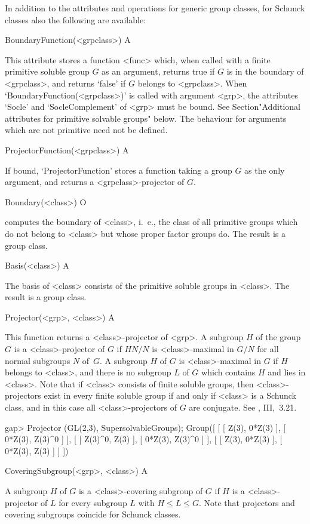 In addition to the attributes and operations for generic group classes,
for Schunck classes also the following are available:

\>BoundaryFunction(<grpclass>) A

This attribute stores a function <func> which, when called with a finite primitive
soluble group $G$ as an argument, returns true if $G$ is in the boundary of <grpclass>,
and returns `false' if $G$ belongs to <grpclass>. When `BoundaryFunction(<grpclass>)'
is called with argument <grp>, the attributes `Socle' and `SocleComplement' of 
<grp> must be bound. See Section"Additional attributes for primitive solvable
groups" below. The behaviour for arguments which are not primitive need not
be defined. 

\>ProjectorFunction(<grpclass>) A

If bound, `ProjectorFunction' stores a function taking a group $G$ as the
only argument, and returns a <grpclass>-projector of $G$. 

\>Boundary(<class>) O

computes the boundary of <class>, i.~e., the class of all
primitive groups which do not belong to <class> but whose proper
factor groups do. The result is a group class. 

\>Basis(<class>) A

The basis of <class> consists of the primitive soluble 
groups in <class>. The result is a group class. 

\>Projector(<grp>, <class>) A

This function returns a <class>-projector of <grp>. A subgroup 
$H$ of the group $G$ is a <class>-projector of $G$ if $H N/N$ is
<class>-maximal in $G/N$ for all normal subgroups $N$ of~$G$. A subgroup $H$
of $G$ is <class>-maximal in $G$ if $H$ belongs to <class>, and there is no
subgroup $L$ of $G$ which contains $H$ and lies in <class>. Note that if
<class> consists of finite soluble groups, then <class>-projectors exist in
every finite soluble group if and only if <class> is a Schunck class, and in
this case all <class>-projectors of
$G$ are conjugate. See \cite{DH1992}, III,~3.21.

\beginexample
gap> Projector (GL(2,3), SupersolvableGroups);
Group([ [ [ Z(3), 0*Z(3) ], [ 0*Z(3), Z(3)^0 ] ], 
  [ [ Z(3)^0, Z(3) ], [ 0*Z(3), Z(3)^0 ] ], 
  [ [ Z(3), 0*Z(3) ], [ 0*Z(3), Z(3) ] ] ])
\endexample

\>CoveringSubgroup(<grp>, <class>) A

A subgroup $H$ of $G$ is a <class>-covering subgroup of $G$ if $H$ is a
<class>-projector of $L$ for every subgroup $L$ with $H \leq L \leq G$.
Note that projectors and covering subgroups coincide for Schunck classes. 


